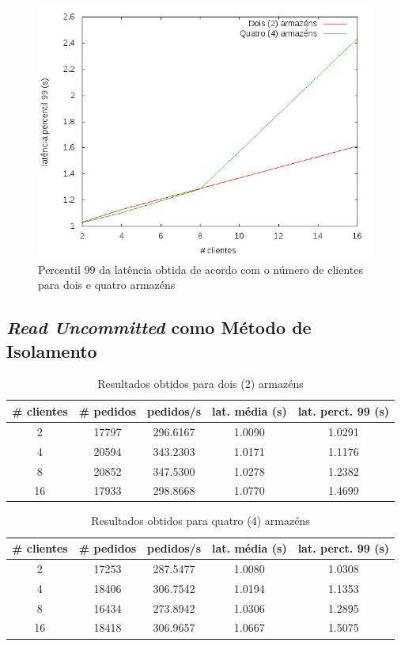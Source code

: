 \begin{figure}[!h]
\centering
\includegraphics[scale=.5]{img/questao-1/rep-read-lat-pct99}
\caption{Percentil 99 da latência obtida de acordo com o número de clientes para dois e quatro armazéns}
\end{figure}

\subsection{\textit{Read Uncommitted} como Método de Isolamento}

\begin{table}[!h]
\center
\small
\begin{tabular}{|c|c|c|c|c|}
\hline
\textbf{\# clientes} & \textbf{\# pedidos} & \textbf{pedidos/s} & \textbf{lat. média (s)} & \textbf{lat. perct. 99 (s)}  \\ \hline
2 & 17797 & 296.6167 & 1.0090 & 1.0291  \\ \hline
4 & 20594 & 343.2303 & 1.0171 & 1.1176  \\ \hline
8 & 20852 & 347.5300 & 1.0278 & 1.2382  \\ \hline
16 & 17933 & 298.8668 & 1.0770 & 1.4699  \\ \hline
\end{tabular}
\caption{Resultados obtidos para dois (2) armazéns}
\end{table}

\begin{table}[!h]
\center
\small
\begin{tabular}{|c|c|c|c|c|}
\hline
\textbf{\# clientes} & \textbf{\# pedidos} & \textbf{pedidos/s} & \textbf{lat. média (s)} & \textbf{lat. perct. 99 (s)}  \\ \hline
2 & 17253 & 287.5477 & 1.0080 & 1.0308  \\ \hline
4 & 18406 & 306.7542 & 1.0194 & 1.1353  \\ \hline
8 & 16434 & 273.8942 & 1.0306 & 1.2895  \\ \hline
16 & 18418 & 306.9657 & 1.0667 & 1.5075  \\ \hline
\end{tabular}
\caption{Resultados obtidos para quatro (4) armazéns}
\end{table}

